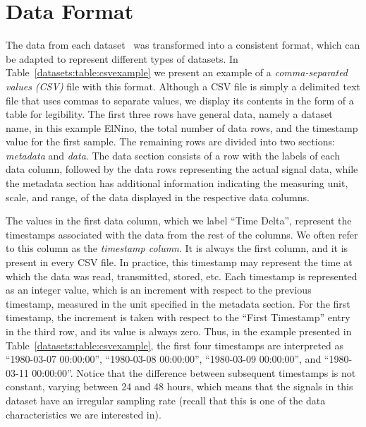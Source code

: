 
\clearpage
\section{Data Format}
\label{datasets:over}


The data from each dataset \dataCite\ was transformed into a consistent format, which can be adapted to represent different types of datasets. In Table~\ref{datasets:table:csvexample} we present an example of a \textit{comma-separated values (CSV)} file with this format. Although a CSV file is simply a delimited text file that uses commas to separate values, we display its contents in the form of a table for legibility. The first three rows have general data, namely a dataset name, in this example ElNino, the total number of data rows, and the timestamp value for the first sample. The remaining rows are divided into two sections: \textit{metadata} and \textit{data}. The data section consists of a row with the labels of each data column, followed by the data rows representing the actual signal data, while the metadata section has additional information indicating the measuring unit, scale, and range, of the data displayed in the respective data columns.





\vspace{-5pt}
The values in the first data column, which we label ``Time Delta'', represent the timestamps associated with the data from the rest of the columns. We often refer to this column as the \textit{timestamp column}. It is always the first column, and it is present in every CSV file. In practice, this timestamp may represent the time at which the data was read, transmitted, stored, etc. Each timestamp is represented as an integer value, which is an increment with respect to the previous timestamp, measured in the unit specified in the metadata section. For the first timestamp, the increment is taken with respect to the ``First Timestamp'' entry in the third row, and its value is always zero. Thus, in the example presented in Table~\ref{datasets:table:csvexample}, the first four timestamps are interpreted as ``1980-03-07 00:00:00'', ``1980-03-08 00:00:00'', ``1980-03-09 00:00:00'', and ``1980-03-11 00:00:00''. Notice that the difference between subsequent timestamps is not constant, varying between 24 and 48 hours, which means that the signals in this dataset have an irregular sampling rate (recall that this is one of the data characteristics we are interested in).


